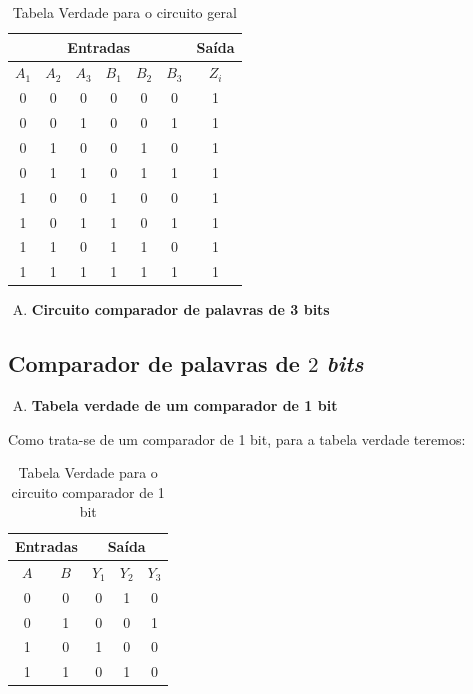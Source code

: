 \documentclass[12pt]{article}
\begin{document}
\begin{table}[H]
    \centering
    \caption{Tabela Verdade para o circuito geral}
    \begin{tabular}{|c|c|c|c|c|c|c|}\hline
    \multicolumn{6}{|c|}{Entradas} & \multicolumn{1}{|c|}{Saída} \\\hline
    $A_{1}$ & $A_{2}$ & $A_{3}$ & $B_{1}$ & $B_{2}$ & $B_{3}$ & $Z_{i}$ \\\hline
    0 & 0 & 0 & 0 & 0 & 0 & 1 \\\hline
    0 & 0 & 1 & 0 & 0 & 1 & 1 \\\hline
    0 & 1 & 0 & 0 & 1 & 0 & 1 \\\hline
    0 & 1 & 1 & 0 & 1 & 1 & 1 \\\hline
    1 & 0 & 0 & 1 & 0 & 0 & 1 \\\hline
    1 & 0 & 1 & 1 & 0 & 1 & 1 \\\hline
    1 & 1 & 0 & 1 & 1 & 0 & 1 \\\hline
    1 & 1 & 1 & 1 & 1 & 1 & 1 \\\hline
    \end{tabular}\label{tab:comparador_de_palavras_3_bits}
\end{table}


\begin{enumerate}[E)]
\item \textbf{Circuito comparador de palavras de 3 bits}
\end{enumerate}

\subsection{Comparador de palavras de \(2\) \emph{bits}}\label{sec:comparador_de_palavras_3_bits}

\begin{enumerate}[A)]
\item \textbf{Tabela verdade de um comparador de 1 bit}
\end{enumerate}

Como trata-se de um comparador de 1 bit, para a tabela verdade teremos:

\begin{table}[H]
    \centering
    \caption{Tabela Verdade para o circuito comparador de 1 bit}
    \begin{tabular}{|c|c|c|c|c|}\hline
    \multicolumn{2}{|c|}{Entradas} & \multicolumn{3}{|c|}{Saída} \\\hline
    \textbf{$A$} & \textbf{$B$} & \textbf{$Y_{1}$} & \textbf{$Y_{2}$} & \textbf{$Y_{3}$} \\\hline
    0 & 0 & 0 & 1 & 0 \\\hline
    0 & 1 & 0 & 0 & 1\\\hline
    1 & 0 & 1 & 0 & 0\\\hline
    1 & 1 & 0 & 1 & 0\\\hline
    \end{tabular}\label{tab:comparador_de_palavras_3_bits}
\end{table}
\end{document}
